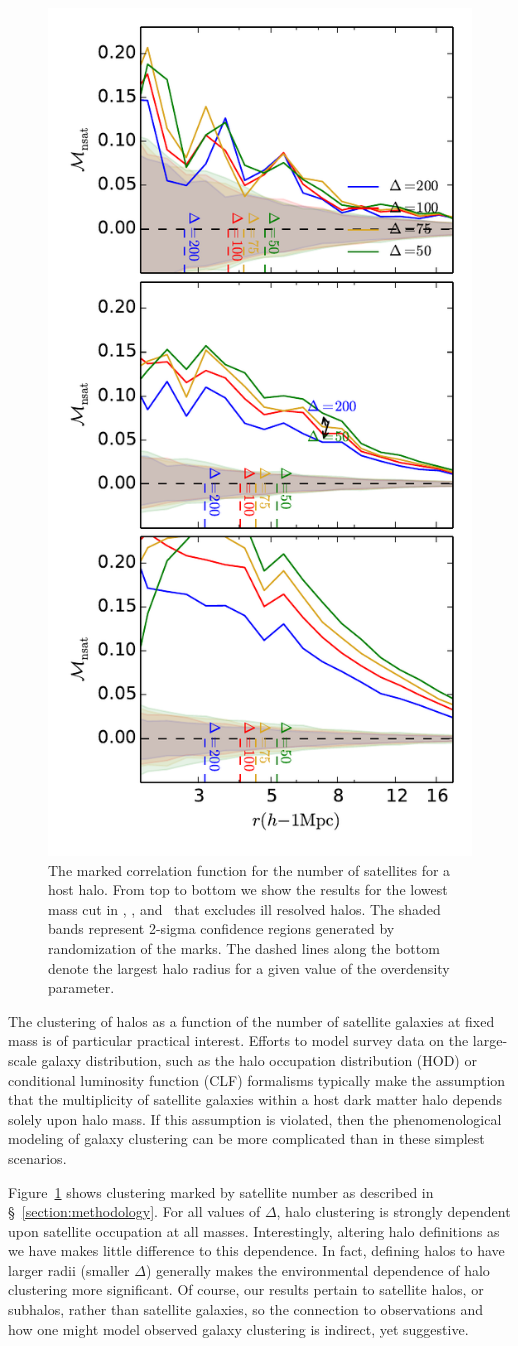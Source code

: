 \documentclass[usenatbib,usegraphicx,letterpaper]{mn2e}
\begin{document}
\begin{figure}
	\centering
	\includegraphics[width=.4\textwidth]{all_mcf_nsat_z00_cutcomp.pdf}
	\caption{The marked correlation function for the number of satellites for a host halo. From top to bottom we show the results for the lowest mass cut in \simA, \simB, and \simC \ that excludes ill resolved halos. The shaded bands represent 2-sigma confidence regions generated by randomization of the marks. The dashed lines along the bottom denote the largest halo radius for a given value of the overdensity parameter.
	}
	\label{fig:cc_mcf_nsat}
\end{figure}


The clustering of halos as a function of the number of satellite galaxies at fixed mass is of 
particular practical interest. Efforts to model survey data on the large-scale galaxy distribution, 
such as the halo occupation distribution (HOD) or conditional luminosity function (CLF) formalisms 
typically make the assumption that the multiplicity of satellite galaxies within a host dark matter 
halo depends solely upon halo mass. If this assumption is violated, then the phenomenological 
modeling of galaxy clustering can be more complicated than in these simplest scenarios.

Figure~\ref{fig:cc_mcf_nsat} shows clustering marked by satellite number as described in 
\S~\ref{section:methodology}. For all values of $\Delta$, halo clustering is strongly dependent 
upon satellite occupation at all masses. Interestingly, altering halo definitions as we have 
makes little difference to this dependence. In fact, defining halos to have larger radii (smaller 
$\Delta$) generally makes the environmental dependence of halo clustering more 
significant. Of course, our results pertain to satellite halos, or subhalos, rather than 
satellite galaxies, so the connection to observations and how one might 
model observed galaxy clustering is indirect, yet suggestive. 
\end{document}
